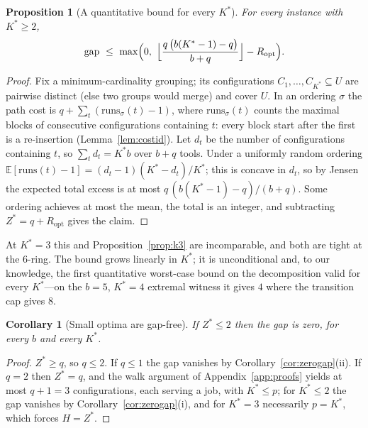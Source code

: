 \documentclass[11pt,a4paper]{article}
\theoremstyle{plain}
\newtheorem{proposition}{Proposition}
\newtheorem{corollary}{Corollary}
\theoremstyle{definition}
\theoremstyle{remark}
\newcommand{\U}{U}
\newcommand{\Kst}{K^{\ast}}
\newcommand{\Zst}{Z^{\ast}}
\begin{document}
\begin{proposition}[A quantitative bound for every $\Kst$]\label{prop:genk}
For every instance with $\Kst\ge2$,
\[
  \mathrm{gap}\ \le\ \max\Bigl(0,\
  \Bigl\lfloor\frac{q\,\bigl(b(\Kst-1)-q\bigr)}{b+q}\Bigr\rfloor
  -R_{\mathrm{opt}}\Bigr).
\]
\end{proposition}
\begin{proof}
Fix a minimum-cardinality grouping; its configurations
$C_1,\dots,C_{\Kst}\subseteq\U$ are pairwise distinct (else two groups would
merge) and cover $\U$. In an ordering $\sigma$ the path cost is
$q+\sum_t(\mathrm{runs}_\sigma(t)-1)$, where $\mathrm{runs}_\sigma(t)$ counts
the maximal blocks of consecutive configurations containing $t$: every block
start after the first is a re-insertion (Lemma~\ref{lem:costid}). Let $d_t$ be
the number of configurations containing $t$, so $\sum_t d_t=\Kst b$ over
$b+q$ tools. Under a uniformly random ordering
$\mathbb{E}[\mathrm{runs}(t)-1]=(d_t-1)(\Kst-d_t)/\Kst$; this is concave in
$d_t$, so by Jensen the expected total excess is at most
$q\,(b(\Kst-1)-q)/(b+q)$. Some ordering achieves at most the mean, the total
is an integer, and subtracting $\Zst=q+R_{\mathrm{opt}}$ gives the claim.
\end{proof}
\noindent At $\Kst=3$ this and Proposition~\ref{prop:k3} are incomparable, and
both are tight at the $6$-ring. The bound grows linearly in $\Kst$; it is
unconditional and, to our knowledge, the first quantitative worst-case bound
on the decomposition valid for every $\Kst$---on the $b=5$, $\Kst=4$ extremal
witness it gives $4$ where the transition cap gives $8$.

\begin{corollary}[Small optima are gap-free]\label{cor:smallZ}
If $\Zst\le2$ then the gap is zero, for every $b$ and every $\Kst$.
\end{corollary}
\begin{proof}
$\Zst\ge q$, so $q\le2$. If $q\le1$ the gap vanishes by
Corollary~\ref{cor:zerogap}(ii). If $q=2$ then $\Zst=q$, and the walk argument
of Appendix~\ref{app:proofs} yields at most $q+1=3$ configurations, each
serving a job, with $\Kst\le p$; for $\Kst\le2$ the gap vanishes by
Corollary~\ref{cor:zerogap}(i), and for $\Kst=3$ necessarily $p=\Kst$, which
forces $H=\Zst$.
\end{proof}
\end{document}
